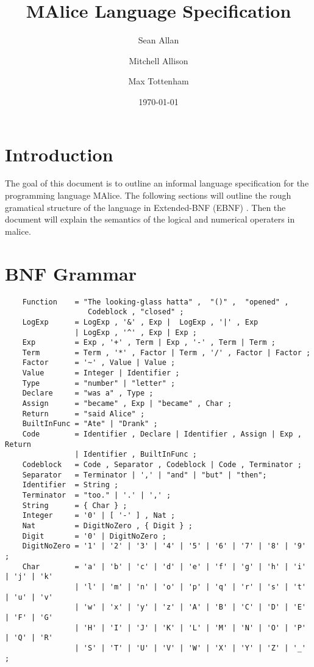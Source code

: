 \documentclass[a4wide, 10pt]{article}
\begin{document}
\title{MAlice Language Specification}

\author{Sean Allan \and Mitchell Allison \and Max Tottenham}

\date{\today}         %

\maketitle            %

\section{Introduction}
The goal of this document is to outline an informal language specification for 
the programming language MAlice. The following sections will outline the rough
gramatical structure of the language in Extended-BNF (EBNF) \cite{Wikipedia}. 
Then the document will explain the semantics of the logical and numerical operaters in malice.

\section{BNF Grammar} 
\begin{verbatim}
    Function    = "The looking-glass hatta" ,  "()" ,  "opened" , 
                   Codeblock , "closed" ;
    LogExp      = LogExp , '&' , Exp |  LogExp , '|' , Exp 
                | LogExp , '^' , Exp | Exp ;
    Exp         = Exp , '+' , Term | Exp , '-' , Term | Term ;
    Term        = Term , '*' , Factor | Term , '/' , Factor | Factor ;
    Factor      = '~' , Value | Value ;
    Value       = Integer | Identifier ;
    Type        = "number" | "letter" ;
    Declare     = "was a" , Type ;
    Assign      = "became" , Exp | "became" , Char ;
    Return      = "said Alice" ;
    BuiltInFunc = "Ate" | "Drank" ;
    Code        = Identifier , Declare | Identifier , Assign | Exp , Return  
                | Identifier , BuiltInFunc ;
    Codeblock   = Code , Separator , Codeblock | Code , Terminator ; 
    Separator   = Terminator | ',' | "and" | "but" | "then"; 
    Identifier  = String ;
    Terminator  = "too." | '.' | ',' ;
    String      = { Char } ;
    Integer     = '0' | [ '-' ] , Nat ;
    Nat         = DigitNoZero , { Digit } ;
    Digit       = '0' | DigitNoZero ; 
    DigitNoZero = '1' | '2' | '3' | '4' | '5' | '6' | '7' | '8' | '9' ;
    Char        = 'a' | 'b' | 'c' | 'd' | 'e' | 'f' | 'g' | 'h' | 'i' | 'j' | 'k' 
                | 'l' | 'm' | 'n' | 'o' | 'p' | 'q' | 'r' | 's' | 't' | 'u' | 'v'
                | 'w' | 'x' | 'y' | 'z' | 'A' | 'B' | 'C' | 'D' | 'E' | 'F' | 'G'
                | 'H' | 'I' | 'J' | 'K' | 'L' | 'M' | 'N' | 'O' | 'P' | 'Q' | 'R'
                | 'S' | 'T' | 'U' | 'V' | 'W' | 'X' | 'Y' | 'Z' | '_' ;
\end{verbatim}
\end{document}
